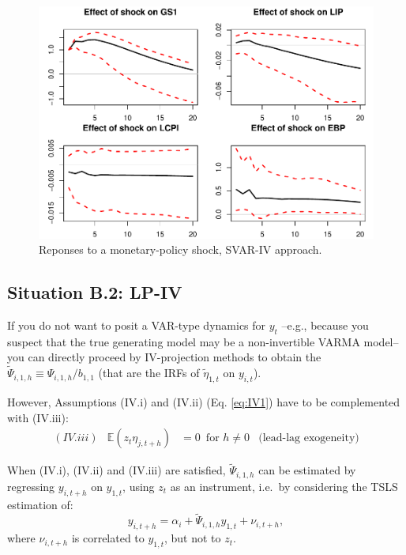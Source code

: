 \documentclass[
  12pt,
]{book}
\theoremstyle{definition}
\theoremstyle{definition}
\theoremstyle{definition}
\theoremstyle{definition}
\theoremstyle{remark}
\begin{document}
\begin{figure}
\includegraphics[width=0.95\linewidth]{IdentifStructShocks_files/figure-latex/essaiIV1-1} \caption{Reponses to a monetary-policy shock, SVAR-IV approach.}\label{fig:essaiIV1}
\end{figure}

\subsection{Situation B.2: LP-IV}\label{LPIVa}

If you do not want to posit a VAR-type dynamics for \(y_t\) --e.g., because you suspect that the true generating model may be a non-invertible VARMA model-- you can directly proceed by IV-projection methods to obtain the \(\tilde\Psi_{i,1,h}\equiv \Psi_{i,1,h}/b_{1,1}\) (that are the IRFs of \(\tilde\eta_{1,t}\) on \(y_{i,t}\)).

However, Assumptions (IV.i) and (IV.ii) (Eq. \eqref{eq:IV1}) have to be complemented with (IV.iii):
\begin{equation*}
\begin{array}{llll}
(IV.iii) & \mathbb{E}(z_t \eta_{j,t+h}) &= 0 \, \mbox{ for } h \ne 0 & \mbox{(lead-lag exogeneity)}
\end{array}
\end{equation*}

When (IV.i), (IV.ii) and (IV.iii) are satisfied, \(\tilde\Psi_{i,1,h}\) can be estimated by regressing \(y_{i,t+h}\) on \(y_{1,t}\), using \(z_t\) as an instrument, i.e.~by considering the TSLS estimation of:
\begin{equation}
y_{i,t+h} = \alpha_i + \tilde\Psi_{i,1,h}y_{1,t} + \nu_{i,t+h},\label{eq:regIV1}
\end{equation}
where \(\nu_{i,t+h}\) is correlated to \(y_{1,t}\), but not to \(z_t\).
\end{document}
